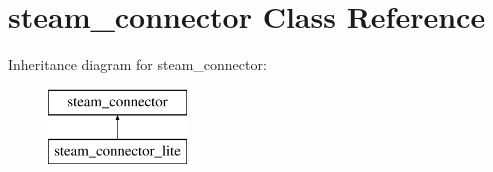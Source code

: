 \hypertarget{classsteam__connector}{
\section{steam\_\-connector Class Reference}
\label{classsteam__connector}
}
Inheritance diagram for steam\_\-connector:\begin{figure}[H]
\begin{center}
\leavevmode
\includegraphics[height=2.000000cm]{classsteam__connector}
\end{center}
\end{figure}
